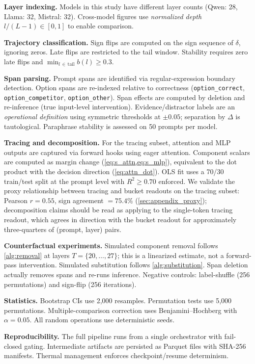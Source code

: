 \documentclass{article}
\begin{document}
\textbf{Layer indexing.}  Models in this study have different layer counts (Qwen: 28, Llama: 32, Mistral: 32).  Cross-model figures use \emph{normalized depth} $l/(L{-}1) \in [0,1]$ to enable comparison.

\textbf{Trajectory classification.}  Sign flips are computed on the sign sequence of $\delta$, ignoring zeros.  Late flips are restricted to the tail window.  Stability requires zero late flips and $\min_{l\, \in\, \mathrm{tail}} b(l) \geq 0.3$.

\textbf{Span parsing.}  Prompt spans are identified via regular-expression boundary detection.  Option spans are re-indexed relative to correctness (\texttt{option\_correct}, \texttt{option\_competitor}, \texttt{option\_other}).  Span effects are computed by deletion and re-inference (true input-level intervention).  Evidence/distractor labels are an \emph{operational definition} using symmetric thresholds at $\pm 0.05$; separation by $\Delta$ is tautological.  Paraphrase stability is assessed on 50 prompts per model.

\textbf{Tracing and decomposition.}  For the tracing subset, attention and MLP outputs are captured via forward hooks using eager attention.  Component scalars are computed as margin change (\cref{eq:s_attn,eq:s_mlp}), equivalent to the dot product with the decision direction (\cref{eq:attn_dot}).  OLS fit uses a 70/30 train/test split at the prompt level with $R^2 \geq 0.70$ enforced.  We validate the proxy relationship between tracing and bucket readouts on the tracing subset: Pearson $r = 0.55$, sign agreement $= 75.4\%$ (\cref{sec:appendix_proxy}); decomposition claims should be read as applying to the single-token tracing readout, which agrees in direction with the bucket readout for approximately three-quarters of (prompt, layer) pairs.

\textbf{Counterfactual experiments.}  Simulated component removal follows \cref{alg:removal} at layers $T = \{20, \ldots, 27\}$; this is a linearized estimate, not a forward-pass intervention.  Simulated substitution follows \cref{alg:substitution}.  Span deletion actually removes spans and re-runs inference.  Negative controls: label-shuffle (256 permutations) and sign-flip (256 iterations).

\textbf{Statistics.}  Bootstrap CIs use 2{,}000 resamples.  Permutation tests use 5{,}000 permutations.  Multiple-comparison correction uses Benjamini--Hochberg with $\alpha = 0.05$.  All random operations use deterministic seeds.

\textbf{Reproducibility.}  The full pipeline runs from a single orchestrator with fail-closed gating.  Intermediate artifacts are persisted as Parquet files with SHA-256 manifests.  Thermal management enforces checkpoint/resume determinism.
\end{document}
